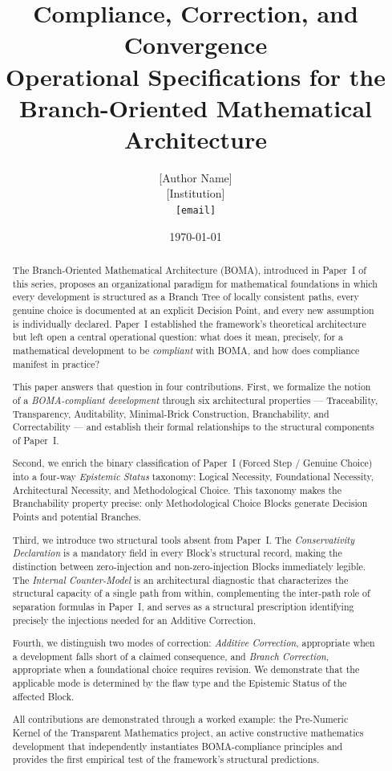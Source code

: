 \documentclass[12pt, a4paper]{article}
\title{%
  \textbf{Compliance, Correction, and Convergence}\\[0.5em]
  \large Operational Specifications for the\\
  Branch-Oriented Mathematical Architecture%
}
\author{%
  [Author Name]\\
  \small [Institution]\\
  \small \texttt{[email]}%
}
\date{\today}
\theoremstyle{plain}
\theoremstyle{definition}
\theoremstyle{remark}
\newcommand{\BOMA}{\textsf{BOMA}}
\begin{document}

\maketitle

\begin{abstract}
The Branch-Oriented Mathematical Architecture (\BOMA{}), introduced
in Paper~I of this series, proposes an organizational paradigm for
mathematical foundations in which every development is structured as a
Branch Tree of locally consistent paths, every genuine choice is
documented at an explicit Decision Point, and every new assumption is
individually declared. Paper~I established the framework's theoretical
architecture but left open a central operational question: what does
it mean, precisely, for a mathematical development to be
\emph{compliant} with \BOMA{}, and how does compliance manifest in
practice?

This paper answers that question in four contributions. First, we
formalize the notion of a \emph{\BOMA{}-compliant development} through
six architectural properties --- Traceability, Transparency,
Auditability, Minimal-Brick Construction, Branchability, and
Correctability --- and establish their formal relationships to the
structural components of Paper~I.

Second, we enrich the binary classification of Paper~I (Forced Step /
Genuine Choice) into a four-way \emph{Epistemic Status} taxonomy:
Logical Necessity, Foundational Necessity, Architectural Necessity,
and Methodological Choice. This taxonomy makes the Branchability
property precise: only Methodological Choice Blocks generate Decision
Points and potential Branches.

Third, we introduce two structural tools absent from Paper~I. The
\emph{Conservativity Declaration} is a mandatory field in every
Block's structural record, making the distinction between zero-injection
and non-zero-injection Blocks immediately legible. The \emph{Internal
Counter-Model} is an architectural diagnostic that characterizes the
structural capacity of a single path from within, complementing the
inter-path role of separation formulas in Paper~I, and serves as a
structural prescription identifying precisely the injections needed for
an Additive Correction.

Fourth, we distinguish two modes of correction: \emph{Additive
Correction}, appropriate when a development falls short of a claimed
consequence, and \emph{Branch Correction}, appropriate when a
foundational choice requires revision. We demonstrate that the
applicable mode is determined by the flaw type and the Epistemic Status
of the affected Block.

All contributions are demonstrated through a worked example: the
Pre-Numeric Kernel of the Transparent Mathematics project, an active
constructive mathematics development that independently instantiates
\BOMA{}-compliance principles and provides the first empirical test of
the framework's structural predictions.
\end{abstract}
\end{document}
